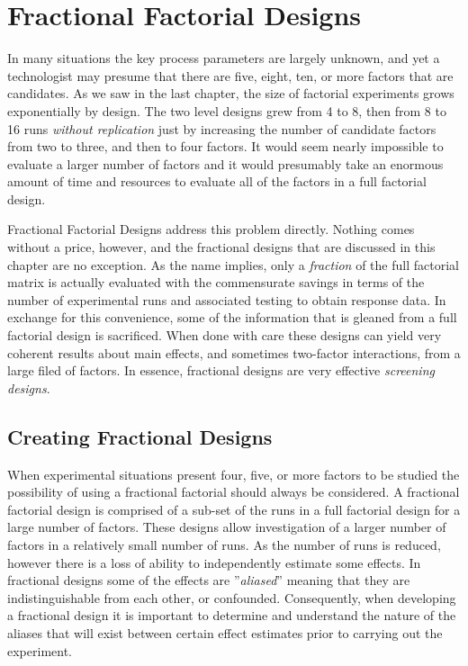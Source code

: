 
\chapter{Fractional Factorial Designs}
In many situations the key process parameters are largely unknown, and yet a technologist may presume that there are five, eight, ten, or more factors that are candidates.  As we saw in the last chapter, the size of factorial experiments grows exponentially by design. The two level designs grew from 4 to 8, then from 8 to 16 runs \textit{without replication} just by increasing the number of candidate factors from two to three, and then to four factors.  It would seem nearly impossible to evaluate a larger number of factors and it would presumably take an enormous amount of time and resources to evaluate all of the factors in a full factorial design.

Fractional Factorial Designs address this problem directly.  Nothing comes without a price, however, and the fractional designs that are discussed in this chapter are no exception. As the name implies, only a \textit{fraction} of the full factorial matrix is actually evaluated with the commensurate savings in terms of the number of experimental runs and associated testing to obtain response data.  In exchange for this convenience, some of the information that is gleaned from a full factorial design is sacrificed.  When done with care these designs can yield very coherent results about main effects, and sometimes two-factor interactions, from a large filed of factors.  In essence, fractional designs are very effective \textit{screening designs}.

\section{Creating Fractional Designs}
When experimental situations present four, five, or more factors to be studied the possibility of using a fractional factorial should always be considered. A fractional factorial design is comprised of a sub-set of the runs in a full factorial design for a large number of factors.  These designs allow investigation of a larger number of factors in a relatively small number of runs.  As the number of runs is reduced, however there is a loss of ability to independently estimate some effects.  In fractional designs some of the effects are ''\textit{aliased}'' meaning that they are indistinguishable from each other, or confounded. Consequently, when developing a fractional design it is important to determine and understand the nature of the aliases that will exist between certain effect estimates prior to carrying out the experiment.

